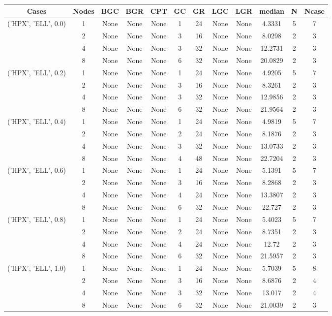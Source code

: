 \begin{tabular}{cccccccccccc}
\hline
Cases & Nodes& BGC& BGR& CPT& GC& GR& LGC& LGR& median & N & Ncase \\
\hline
\multirow{4}{*}{('HPX', 'ELL', 0.0)}& 1& None& None& None& 1& 24& None& None& 4.3331& 5& 7\\
& 2& None& None& None& 3& 16& None& None& 8.0298& 2& 3\\
& 4& None& None& None& 3& 32& None& None& 12.2731& 2& 3\\
& 8& None& None& None& 6& 32& None& None& 20.0829& 2& 3\\
\hline
\multirow{4}{*}{('HPX', 'ELL', 0.2)}& 1& None& None& None& 1& 24& None& None& 4.9205& 5& 7\\
& 2& None& None& None& 3& 16& None& None& 8.3261& 2& 3\\
& 4& None& None& None& 3& 32& None& None& 12.9856& 2& 3\\
& 8& None& None& None& 6& 32& None& None& 21.9564& 2& 3\\
\hline
\multirow{4}{*}{('HPX', 'ELL', 0.4)}& 1& None& None& None& 1& 24& None& None& 4.9819& 5& 7\\
& 2& None& None& None& 2& 24& None& None& 8.1876& 2& 3\\
& 4& None& None& None& 3& 32& None& None& 13.0733& 2& 3\\
& 8& None& None& None& 4& 48& None& None& 22.7204& 2& 3\\
\hline
\multirow{4}{*}{('HPX', 'ELL', 0.6)}& 1& None& None& None& 1& 24& None& None& 5.1391& 5& 7\\
& 2& None& None& None& 3& 16& None& None& 8.2868& 2& 3\\
& 4& None& None& None& 4& 24& None& None& 13.3807& 2& 3\\
& 8& None& None& None& 6& 32& None& None& 22.727& 2& 3\\
\hline
\multirow{4}{*}{('HPX', 'ELL', 0.8)}& 1& None& None& None& 1& 24& None& None& 5.4023& 5& 7\\
& 2& None& None& None& 2& 24& None& None& 8.7351& 2& 3\\
& 4& None& None& None& 4& 24& None& None& 12.72& 2& 3\\
& 8& None& None& None& 6& 32& None& None& 21.5957& 2& 3\\
\hline
\multirow{4}{*}{('HPX', 'ELL', 1.0)}& 1& None& None& None& 1& 24& None& None& 5.7039& 5& 8\\
& 2& None& None& None& 3& 16& None& None& 8.6876& 2& 4\\
& 4& None& None& None& 3& 32& None& None& 13.017& 2& 4\\
& 8& None& None& None& 6& 32& None& None& 21.0039& 2& 3\\
\hline
\end{tabular}




